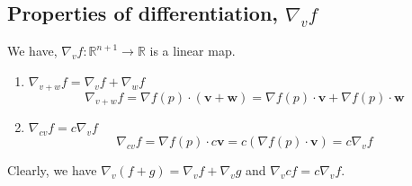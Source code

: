 \subsection{Properties of differentiation, $\nabla_v f$}
We have, $\nabla_v f : \mathbb{R}^{n+1} \to \mathbb{R}$ is a linear map.
\begin{enumerate}
	\item $\nabla_{v+w} f = \nabla_v f + \nabla_w f$
		\[ \nabla_{v+w} f = \nabla f(p) \cdot (\mathbf{v} + \mathbf{w}) = \nabla f(p) \cdot \mathbf{v} + \nabla f(p) \cdot \mathbf{w} \]
	\item $\nabla_{cv} f = c\nabla_v f$
		\[ \nabla_{cv} f = \nabla f(p) \cdot c\mathbf{v} = c\left( \nabla f(p) \cdot \mathbf{v} \right) = c\nabla_v f \]
\end{enumerate}
Clearly, we have $\nabla_v (f+g) = \nabla_v f + \nabla_v g$ and $\nabla_v cf = c\nabla_v f$.


